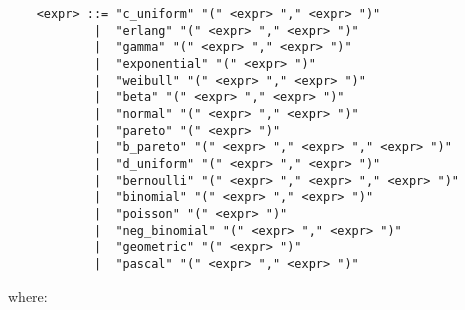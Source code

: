 	\begin{verbatim}
    <expr> ::= "c_uniform" "(" <expr> "," <expr> ")"
            |  "erlang" "(" <expr> "," <expr> ")"
            |  "gamma" "(" <expr> "," <expr> ")"
            |  "exponential" "(" <expr> ")"
            |  "weibull" "(" <expr> "," <expr> ")"
            |  "beta" "(" <expr> "," <expr> ")"
            |  "normal" "(" <expr> "," <expr> ")"
            |  "pareto" "(" <expr> ")"
            |  "b_pareto" "(" <expr> "," <expr> "," <expr> ")"
            |  "d_uniform" "(" <expr> "," <expr> ")"
            |  "bernoulli" "(" <expr> "," <expr> "," <expr> ")"
            |  "binomial" "(" <expr> "," <expr> ")"
            |  "poisson" "(" <expr> ")"
            |  "neg_binomial" "(" <expr> "," <expr> ")"
            |  "geometric" "(" <expr> ")"
            |  "pascal" "(" <expr> "," <expr> ")"
	\end{verbatim}

\noindent where:


